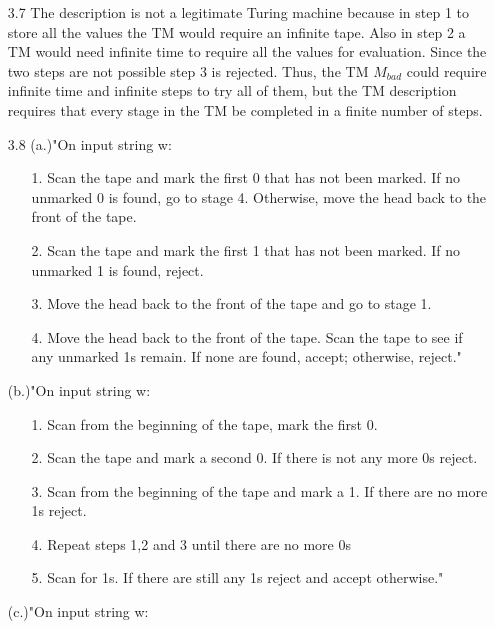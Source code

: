 \documentclass[10pt] {article}
\begin{document}
\begin{enumerate}
(b.)No. $\Sigma$ never contains $\sqcup$, but $\Gamma$ always contains $\sqcup$. Therefore, they cannot be equal.\\
(c.)Yes. If a Turing machine attempts to move its head off the left-hand end of the tape, it remains on the same tape cell.\\
(d.)No.Any Turing machine must contain two distinct states: $q_{accept}$ and $q_{reject}$. Therefore, a Turing machine contains at least two states.
\item[3.7]
The description is not a legitimate Turing machine because in step 1 to store all the values the TM would require an infinite tape. Also in step 2 a TM would need infinite time to require all the values for evaluation. Since the two steps are not possible step 3 is rejected. Thus, the TM $M_{bad}$ could require infinite time and infinite steps to try all of them, but the TM description requires that every stage in the TM be completed in a finite number of steps.  
\item[3.8]
(a.)"On input string w:
\begin{enumerate}
\item[1.]Scan the tape and mark the first 0 that has not been marked. If
no unmarked 0 is found, go to stage 4. Otherwise, move the
head back to the front of the tape.
\item[2.]Scan the tape and mark the first 1 that has not been marked. If
no unmarked 1 is found, reject.
\item[3.] Move the head back to the front of the tape and go to stage 1.
\item[4.]Move the head back to the front of the tape. Scan the tape to see
if any unmarked 1s remain. If none are found, accept; otherwise,
reject."
\end{enumerate}
(b.)"On input string w:
\begin{enumerate}
\item[1.]Scan from the beginning of the tape, mark the first 0.
\item[2.]Scan the tape and mark a second 0. If there is not any more 0s reject.
\item[3.]Scan from the beginning of the tape and mark a 1. If there are no more 1s reject. 
\item[4.]Repeat steps 1,2 and 3 until there are no more 0s
\item[5.]Scan for 1s. If there are still any 1s reject and accept otherwise."
\end{enumerate}
(c.)"On input string w:
\begin{enumerate}

\end{enumerate}
\end{enumerate}
\end{document}
